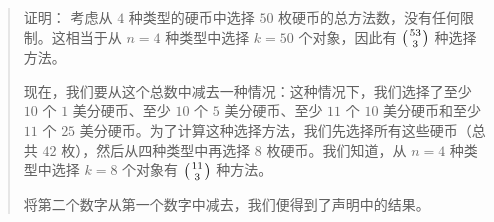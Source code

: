 \begin{enumerate}[label=(\arabic*)]
\begin{quotation}
              \begin{questions}{证明：}
                  考虑从 $4$ 种类型的硬币中选择 $50$ 枚硬币的总方法数，没有任何限制。这相当于从 $n = 4$ 种类型中选择 $k = 50$ 个对象，因此有 $\big({53 \atop 3}\big)$ 种选择方法。

                  现在，我们要从这个总数中减去一种情况：这种情况下，我们选择了至少 $10$ 个 $1$ 美分硬币、至少 $10$ 个 $5$ 美分硬币、至少 $11$ 个 $10$ 美分硬币和至少 $11$ 个 $25$ 美分硬币。为了计算这种选择方法，我们先选择所有这些硬币（总共 $42$ 枚），然后从四种类型中再选择 $8$ 枚硬币。我们知道，从 $n = 4$ 种类型中选择 $k = 8$ 个对象有 $\big({11 \atop 3}\big)$ 种方法。

                  将第二个数字从第一个数字中减去，我们便得到了声明中的结果。
              \end{questions}
          \end{quotation}
\end{enumerate}